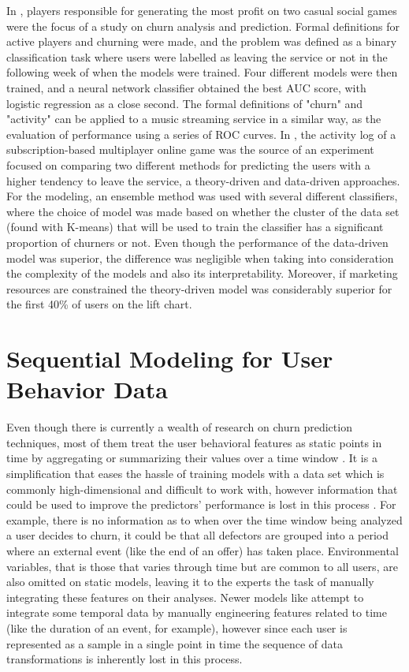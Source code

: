 \documentclass{kththesis}
\begin{document}
In \citep{Runge2014}, players responsible for generating the most profit on two casual social games were the focus of a study on churn analysis and prediction. Formal definitions for active players and churning were made, and the problem was defined as a binary classification task where users were labelled as leaving the service or not in the following week of when the models were trained. Four different models were then trained, and a neural network classifier obtained the best AUC score, with logistic regression as a close second. The formal definitions of "churn" and "activity" can be applied to a music streaming service in a similar way, as the evaluation of performance using a series of ROC curves. In \citep{Borbora2011}, the activity log of a subscription-based multiplayer online game was the source of an experiment focused on comparing two different methods for predicting the users with a higher tendency to leave the service, a theory-driven and data-driven approaches. For the modeling, an ensemble method was used with several different classifiers, where the choice of model was made based on whether the cluster of the data set (found with K-means) that will be used to train the classifier has a significant proportion of churners or not. Even though the performance of the data-driven model was superior, the difference was negligible when taking into consideration the complexity of the models and also its interpretability. Moreover, if marketing resources are constrained the theory-driven model was considerably superior for the first 40\% of users on the lift chart. 


\section{Sequential Modeling for User Behavior Data}

Even though there is currently a wealth of research on churn prediction techniques, most of them treat the user behavioral features as static points in time by aggregating or summarizing their values over a time window \citep{Auon2015}. It is a simplification that eases the hassle of training models with a data set which is commonly high-dimensional and difficult to work with, however information that could be used to improve the predictors' performance is lost in this process  \citep{GurAli2014}. For example, there is no information as to when over the time window being analyzed a user decides to churn, it could be that all defectors are grouped into a period where an external event (like the end of an offer) has taken place. Environmental variables, that is those that varies through time but are common to all users, are also omitted on static models, leaving it to the experts the task of manually integrating these features on their analyses. Newer models like \citep{Pudipeddi2014} attempt to integrate some temporal data by manually engineering features related to time (like the duration of an event, for example), however since each user is represented as a sample in a single point in time the sequence of data transformations is inherently lost in this process.
\end{document}

